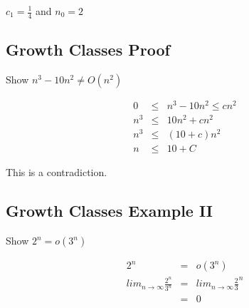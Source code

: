 \documentclass{article}
\begin{document}
$c_1 = \frac{1}{4}$ and $n_0 = 2$

\subsection{Growth Classes Proof}
Show $n^3 - 10n^2 \neq O(n^2)$

\begin{eqnarray}
0 & \leq & n^3 - 10n^2 \leq cn^2 \\
n^3 & \leq & 10n^2 + cn^2 \\
n^3 & \leq & (10+c)n^2 \\
n & \leq & 10 + C
\end{eqnarray}

This is a contradiction.

\subsection{Growth Classes Example II}
Show $2^n = o(3^n)$

\begin{eqnarray}
2^n & = & o(3^n) \\
lim _{n \rightarrow \infty} \frac{2^n}{3^n} & = & lim _{n \rightarrow \infty} \frac{2}{3}^n \\
& = & 0
\end{eqnarray}
\end{document}
